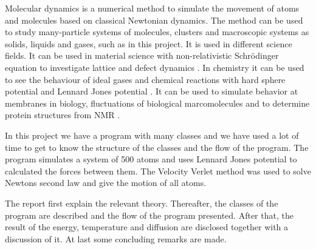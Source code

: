 

Molecular dynamics is a numerical method to simulate the movement of atoms and molecules based on classical Newtonian dynamics. The method can be used to study many-particle systems of molecules, clusters and macroscopic systems as solids, liquids and gases, such as in this project. It is used in different science fields. It can be used in material science with non-relativistic Schrödinger equation to investigate lattice and defect dynamics \cite{materialphysics}. In chemistry it can be used to see the behaviour of ideal gases and chemical reactions with hard sphere potential and Lennard Jones potential \cite{GORECKI1989245}. It can be used to simulate behavior at membranes in biology, fluctuations of biological marcomolecules and to determine protein structures from NMR \cite{biology}.

In this project we have a program with many classes and we have used a lot of time to get to know the structure of the classes and the flow of the program. The program simulates a system of 500 atoms and uses Lennard Jones potential to calculated the forces between them. The Velocity Verlet method was used to solve Newtons second law and give the motion of all atoms.

The report first explain the relevant theory. Thereafter, the classes of the program are described and the flow of the program presented. After that, the result of the energy, temperature and diffusion are disclosed together with a discussion of it. At last some concluding remarks are made. 

%
%
%
%
%	
%
